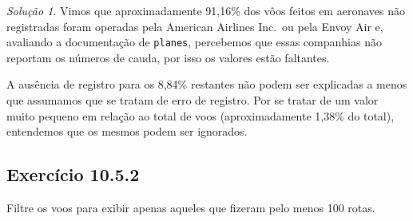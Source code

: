 \documentclass[
]{latex/krantz}
\theoremstyle{definition}
\theoremstyle{definition}
\theoremstyle{definition}
\theoremstyle{definition}
\theoremstyle{remark}
\newtheorem*{solution}{Solução}
\begin{document}
\begin{solution}
Vimos que aproximadamente 91,16\% dos vôos feitos em aeronaves não registradas foram operadas pela American Airlines Inc.~ou pela Envoy Air e, avaliando a documentação de \texttt{planes}, percebemos que essas companhias não reportam os números de cauda, por isso os valores estão faltantes.

A ausência de registro para os 8,84\% restantes não podem ser explicadas a menos que assumamos que se tratam de erro de registro. Por se tratar de um valor muito pequeno em relação ao total de voos (aproximadamente 1,38\% do total), entendemos que os mesmos podem ser ignorados.
\end{solution}

\hypertarget{exr10-5-2}{%
\subsection*{Exercício 10.5.2}\label{exr10-5-2}}

Filtre os voos para exibir apenas aqueles que fizeram pelo menos 100 rotas.
\end{document}
